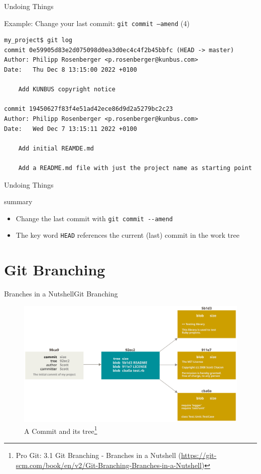 \documentclass[aspectratio=169]{beamer}
\renewcommand{\footnotesize}{\tiny}
\newcommand{\sectiontitle}{}
\newcommand{\newsection}[1]{\renewcommand{\sectiontitle}{#1}\section{#1}}
\begin{document}
\begin{frame}[fragile]{Undoing Things}{\sectiontitle}
\begin{block}{Example: Change your last commit: \texttt{git commit --amend} {\small(4)}}
\begin{verbatim}
my_project$ git log
commit 0e59905d83e2d075098d0ea3d0ec4c4f2b45bbfc (HEAD -> master)
Author: Philipp Rosenberger <p.rosenberger@kunbus.com>
Date:   Thu Dec 8 13:15:00 2022 +0100

    Add KUNBUS copyright notice

commit 19450627f83f4e51ad42ece86d9d2a5279bc2c23
Author: Philipp Rosenberger <p.rosenberger@kunbus.com>
Date:   Wed Dec 7 13:15:11 2022 +0100

    Add initial REAMDE.md
    
    Add a README.md file with just the project name as starting point
\end{verbatim}
\end{block}
\end{frame}

\begin{frame}[fragile]{Undoing Things}{\sectiontitle}
\begin{block}{summary}
\begin{itemize}
    \item Change the last commit with \verb|git commit --amend|
    \item The key word \verb|HEAD| references the current (last) commit in the work tree
\end{itemize}
\end{block}
\end{frame}


\newsection{Git Branching}
\begin{frame}{Branches in a Nutshell}{\sectiontitle}
\begin{figure}
    \centering
    \includegraphics[width=\textwidth,height=0.6\textheight,keepaspectratio]{commit-and-tree}
    \caption{
        A Commit and its tree\footnote{
            Pro Git: 3.1 Git Branching - Branches in a Nutshell
            (\url{https://git-scm.com/book/en/v2/Git-Branching-Branches-in-a-Nutshell})
        }
    }
\end{figure}
\end{frame}
\end{document}
